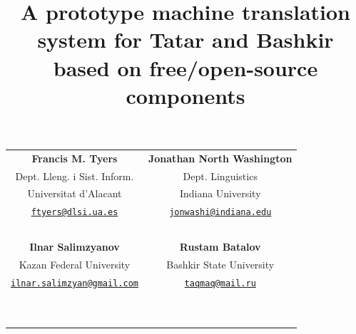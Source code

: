 \documentclass[10pt,xetex]{beamer} %
\date{}
\title{A prototype machine translation system for Tatar and Bashkir \\
              based on free/open-source components}
\begin{document}
\begin{frame} %
        \titlepage
\centering
\begin{tabular}{cc}
 {\bf Francis M. Tyers} & {\bf Jonathan North Washington} \\
 Dept. Lleng. i Sist. Inform. & Dept. Linguistics \\
 Universitat d'Alacant & Indiana University \\
 {\tt \href{mailto:ftyers@dlsi.ua.es}{ftyers@dlsi.ua.es}} & {\tt \href{mailto:jonwashi@indiana.edu}{jonwashi@indiana.edu}} \\ 
 ~ & ~ \\
 {\bf Ilnar Salimzyanov} & {\bf Rustam Batalov} \\
 Kazan Federal University & Bashkir State University \\
 {\tt \href{mailto:ilnar.salimzyan@gmail.com}{ilnar.salimzyan@gmail.com}} & {\tt \href{mailto:taqmaq@mail.ru}{taqmaq@mail.ru}} \\
 ~ & ~ \\
 ~ & ~ \\
\end{tabular}

\end{frame}
\end{document}

